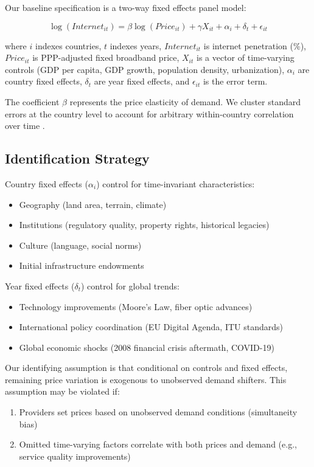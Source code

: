 \documentclass[12pt,review]{elsarticle}
\begin{document}
Our baseline specification is a two-way fixed effects panel model:

\begin{equation}
\log(Internet_{it}) = \beta \log(Price_{it}) + \gamma X_{it} + \alpha_i + \delta_t + \epsilon_{it}
\label{eq:baseline}
\end{equation}

where $i$ indexes countries, $t$ indexes years, $Internet_{it}$ is internet penetration (\%), $Price_{it}$ is PPP-adjusted fixed broadband price, $X_{it}$ is a vector of time-varying controls (GDP per capita, GDP growth, population density, urbanization), $\alpha_i$ are country fixed effects, $\delta_t$ are year fixed effects, and $\epsilon_{it}$ is the error term.

The coefficient $\beta$ represents the price elasticity of demand. We cluster standard errors at the country level to account for arbitrary within-country correlation over time \citep{bertrand2004much}.

\subsection{Identification Strategy}

Country fixed effects ($\alpha_i$) control for time-invariant characteristics:
\begin{itemize}
\item Geography (land area, terrain, climate)
\item Institutions (regulatory quality, property rights, historical legacies)
\item Culture (language, social norms)
\item Initial infrastructure endowments
\end{itemize}

Year fixed effects ($\delta_t$) control for global trends:
\begin{itemize}
\item Technology improvements (Moore's Law, fiber optic advances)
\item International policy coordination (EU Digital Agenda, ITU standards)
\item Global economic shocks (2008 financial crisis aftermath, COVID-19)
\end{itemize}

Our identifying assumption is that conditional on controls and fixed effects, remaining price variation is exogenous to unobserved demand shifters. This assumption may be violated if:
\begin{enumerate}
\item Providers set prices based on unobserved demand conditions (simultaneity bias)
\item Omitted time-varying factors correlate with both prices and demand (e.g., service quality improvements)
\end{enumerate}
\end{document}
